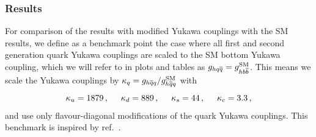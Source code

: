 \subsubsection{Results}
For comparison of the results with modified Yukawa couplings with the SM results, we define as a benchmark point the case where all first and second generation quark Yukawa couplings are scaled to the SM bottom Yukawa coupling, which we will refer to in plots and tables as $g_{hq \overline q} = g_{h b \overline b}^{\mathrm{SM}}$. This means we scale the Yukawa couplings by $\kappa_q=g_{h\overline{q}q}/g_{h\overline q q}^{\mathrm{SM}}$ with
\begin{equation}
	\kappa_u=  1879\,, \hspace*{0.5cm} \kappa_d= 889 \,, \hspace*{0.5cm}\kappa_s= 44\,, \hspace*{0.5cm} \kappa_c =3.3\,, \label{eq:fitbounds}
\end{equation}
and use only flavour-diagonal modifications of the quark Yukawa couplings.
This benchmark is inspired by ref.~\cite{Bar-Shalom:2018rjs}.
\par
